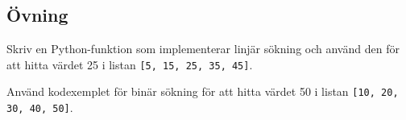 \subsection{Övning}
\begin{exercise}
Skriv en Python-funktion som implementerar linjär sökning och använd den för att hitta värdet 25 i listan \texttt{[5, 15, 25, 35, 45]}.
\end{exercise}

\begin{exercise}
Använd kodexemplet för binär sökning för att hitta värdet 50 i listan \texttt{[10, 20, 30, 40, 50]}.
\end{exercise}

